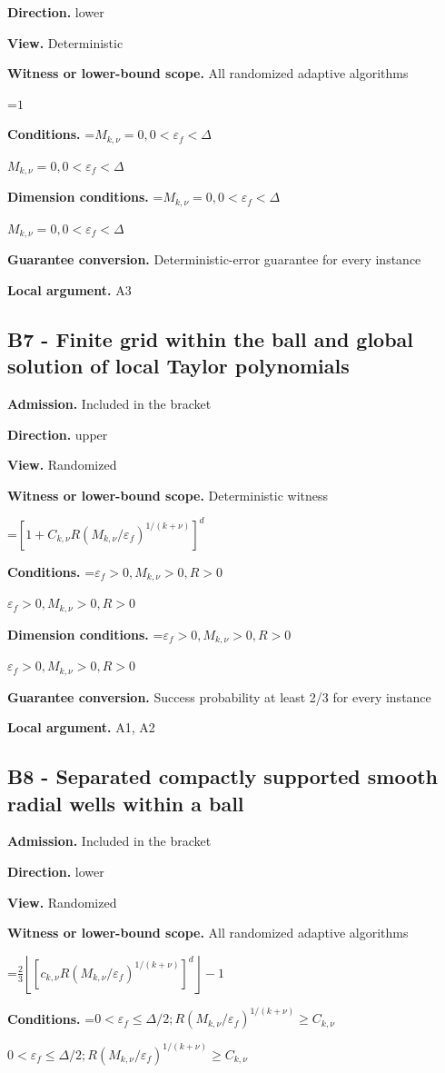 \documentclass[10pt,a4paper]{article}
\newcommand{\AtlasMath}[1]{\par\begingroup\centering\setbox0=\hbox{$\displaystyle #1$}\ifdim\wd0>1.4\linewidth\typeout{ATLAS WIDE FORMULA: \the\wd0}\fi\ifdim\wd0>\linewidth\resizebox{\linewidth}{!}{\box0}\else\box0\fi\par\endgroup}
\newcommand{\AtlasInlineMath}[1]{\begingroup\setbox0=\hbox{$#1$}\ifdim\wd0>.4\linewidth\endgroup\AtlasMath{#1}\else\endgroup$#1$\fi}
\begin{document}
\textbf{Direction.} lower

\textbf{View.} Deterministic

\textbf{Witness or lower-bound scope.} All randomized adaptive algorithms

\AtlasMath{1}
\textbf{Conditions.} \AtlasInlineMath{M_{k,\nu}=0,0<\varepsilon_f<\Delta}

\textbf{Dimension conditions.} \AtlasInlineMath{M_{k,\nu}=0,0<\varepsilon_f<\Delta}

\textbf{Guarantee conversion.} Deterministic-error guarantee for every instance

\textbf{Local argument.} A3

\subsection{B7 - Finite grid within the ball and global solution of local Taylor polynomials}
\textbf{Admission.} Included in the bracket

\textbf{Direction.} upper

\textbf{View.} Randomized

\textbf{Witness or lower-bound scope.} Deterministic witness

\AtlasMath{[1+C_{k,\nu}R(M_{k,\nu}/\varepsilon_f)^{1/(k+\nu)}]^d}
\textbf{Conditions.} \AtlasInlineMath{\varepsilon_f>0,M_{k,\nu}>0,R>0}

\textbf{Dimension conditions.} \AtlasInlineMath{\varepsilon_f>0,M_{k,\nu}>0,R>0}

\textbf{Guarantee conversion.} Success probability at least 2/3 for every instance

\textbf{Local argument.} A1, A2

\subsection{B8 - Separated compactly supported smooth radial wells within a ball}
\textbf{Admission.} Included in the bracket

\textbf{Direction.} lower

\textbf{View.} Randomized

\textbf{Witness or lower-bound scope.} All randomized adaptive algorithms

\AtlasMath{\frac23\left\lfloor[c_{k,\nu}R(M_{k,\nu}/\varepsilon_f)^{1/(k+\nu)}]^d\right\rfloor-1}
\textbf{Conditions.} \AtlasInlineMath{0<\varepsilon_f\le \Delta/2;R(M_{k,\nu}/\varepsilon_f)^{1/(k+\nu)}\ge C_{k,\nu}}
\end{document}
